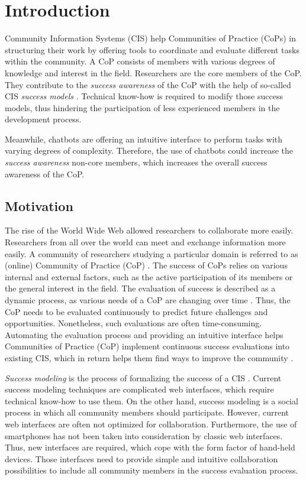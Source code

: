 \chapter{Introduction}
Community Information Systems (CIS) help Communities of Practice (CoPs) in structuring their work by offering tools to coordinate and evaluate different tasks within the community.
A CoP consists of members with various degrees of knowledge and interest in the field.
Researchers are the core members of the CoP.
They contribute to the \emph{success awareness} of the CoP with the help of so-called CIS \emph{success models} \cite{Klam10c}.
Technical know-how is required to modify those success models, thus hindering the participation of less experienced members
in the development process.

Meanwhile, chatbots are offering an intuitive interface to perform tasks with varying degrees of complexity. 
Therefore, the use of chatbots could increase the \emph{success awareness} non-core members, which increases the overall success awareness of the CoP.

\section{Motivation}
The rise of the World Wide Web allowed researchers to collaborate more easily. Researchers from all over the world can meet and exchange information more easily. A community of researchers studying a particular domain is referred to as (online) Community of Practice (CoP) \cite{Renz08}.
The success of CoPs relies on various internal and external factors, such as the active participation of its members or the general interest in the field.
The evaluation of success is described as a dynamic process, as various needs of a CoP are changing over time \cite{Renz08,GKJa08}.
Thus, the CoP needs to be evaluated continuously to predict future challenges and opportunities.
Nonetheless, such evaluations are often time-consuming. Automating the evaluation process and providing an intuitive interface helps Communities of Practice (CoP) implement continuous success evaluations into existing CIS, which in return helps them find ways to improve the community \cite{Renz08}.

\emph{Success modeling} is the process of formalizing the success of a CIS \cite{Renz16}. 
Current success modeling techniques are complicated web interfaces, which require technical know-how to use them.
On the other hand, success modeling is a social process in which all community members should participate. However, current web interfaces are often not optimized for collaboration.
Furthermore, the use of smartphones has not been taken into consideration by classic web interfaces.
Thus, new interfaces are required, which cope with the form factor of hand-held devices. Those interfaces need to provide simple and intuitive collaboration possibilities to include all community members in the success evaluation process. 


